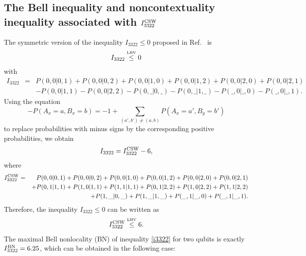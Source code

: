 \documentclass[pra,aps,notitlepage,superscriptaddress,showpacs,showkeys]{revtex4-1}
\theoremstyle{definition}
\theoremstyle{remark}
\begin{document}
\subsection{The Bell inequality and noncontextuality inequality associated with $I_{3322}^{\rm CSW}$}
The symmetric version of the inequality $I_{3322}\le 0$ proposed in Ref.~\cite{BG08} is
\begin{equation}
 I_{3322} \stackrel{\mbox{\tiny{LHV}}}{\leq} 0
\end{equation}
with
\begin{eqnarray}
 I_{3322} &=&P(0,0 \vert 0,1) + P(0,0 \vert 0,2) + P(0,0 \vert 1,0)+ P(0,0 \vert 1,2) + P(0,0 \vert 2,0) + P(0,0 \vert 2,1) \nonumber \\
                    &&- P(0,0 \vert 1,1) - P(0,0 \vert 2,2) - P(0,\_ \vert 0,\_) - P(0,\_ \vert 1,\_) - P(\_,0 \vert \_,0) - P(\_,0 \vert \_,1).
                    \label{I3322BG}
\end{eqnarray}
Using the equation
\begin{equation}
-P(A_x=a,B_x=b)=-1+\sum_{(a',b') \neq (a,b)} P(A_x=a',B_y=b')
\label{transformations}
\end{equation}
to replace probabilities with minus signs by the corresponding positive probabilities, we obtain
\begin{equation}
 I_{3322} = I_{3322}^{\rm CSW} - 6,
\end{equation}
where
\begin{eqnarray}
 I_{3322}^{\rm CSW}
 &=&P(0,0 \vert 0,1) + P(0,0 \vert 0,2) + P(0,0 \vert 1,0)+ P(0,0 \vert 1,2) + P(0,0 \vert 2,0) + P(0,0 \vert 2,1) \nonumber \\
 &&+ P(0,1 \vert 1,1) + P(1,0 \vert 1,1) + P(1,1 \vert 1,1)+ P(0,1 \vert 2,2) + P(1,0 \vert 2,2) + P(1,1 \vert 2,2) \nonumber \\
 &&+ P(1,\_ \vert 0,\_) +P(1,\_ \vert 1,\_) + P(\_,1 \vert \_,0) + P(\_,1 \vert \_,1).
\label{I3322CSW}
\end{eqnarray}
Therefore, the inequality $I_{3322}\le 0$ can be written as
\begin{equation}
 I_{3322}^{\rm CSW} \stackrel{\mbox{\tiny{LHV}}}{\leq} 6.\label{i3322}
\end{equation}
The maximal Bell nonlocality (BN) of inequality \eqref{i3322} for two qubits is exactly $ I_{3322}^{\rm BN}=6.25$, which can be  obtained in the following case:
\end{document}
